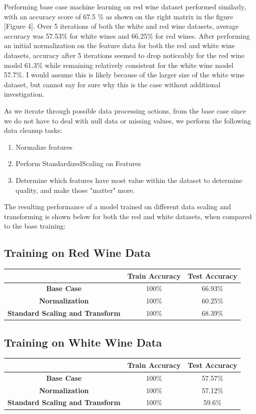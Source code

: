 \documentclass[titlepage]{article}
\begin{document}
\noindent Performing base case machine learning on red wine dataset performed similarly, with an accuracy score of 67.5 \% as shown on the right matrix in the figure [Figure 4].  Over 5 iterations of both the white and red wine datasets, average accuracy was 57.53\% for white wines and  66.25\% for red wines.  After performing an initial normalization on the feature data for both the red and white wine datasets, accuracy after 5 iterations seemed to drop noticeably for the red wine model 61.3\% while remaining relatively consistent for the white wine model 57.7\%.  I would assume this is likely because of the larger size of the white wine dataset, but cannot say for sure why this is the case without additional investigation.

\noindent As we iterate through possible data processing actions, from the base case since we do not have to deal with null data or missing values, we perform the following  data cleanup tasks:
\begin{enumerate}
	\item Normalize features
	\item Perform StandardizedScaling on Features
	\item Determine which features have most value within the dataset to determine quality, and make those "matter" more.
\end{enumerate}

\noindent The resulting performance of a model trained on different data scaling and transforming is shown below for both the red and white datasets, when compared to the base training:  
\subsection*{Training on Red Wine Data}
\begin{center}
	\begin{tabular}{ | c | c | c | }
		\hline
		& \textbf{Train Accuracy} & \textbf{Test Accuracy} \\ 
		\hline
		\textbf{Base Case } & 100\% & 66.93\% \\
		\textbf{Normalization} & 100\% & 60.25\% \\
		\textbf{Standard Scaling and Transform} & 100\% & 68.39\%  \\
		\hline
	\end{tabular}
\end{center}

\subsection*{Training on White Wine Data}
\begin{center}
	\begin{tabular}{ | c | c | c | }
		\hline
		& \textbf{Train Accuracy} & \textbf{Test Accuracy} \\ 
		\hline
		\textbf{Base Case} & 100\% & 57.57\% \\
		\textbf{Normalization} & 100\% & 57.12\% \\
		\textbf{Standard Scaling and Transform} & 100\% & 59.6\%  \\
		\hline
	\end{tabular}
\end{center}
\end{document}

